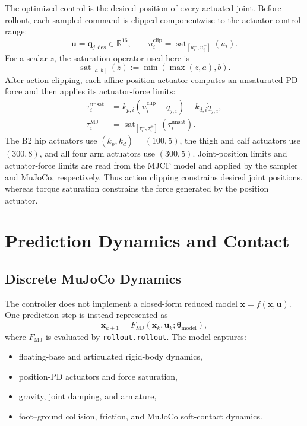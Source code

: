 \documentclass[11pt,a4paper]{article}
\newcommand{\R}{\mathbb{R}}
\newcommand{\code}[1]{\texttt{#1}}
\begin{document}
The optimized control is the desired position of every actuated joint. Before
rollout, each sampled command is clipped componentwise to the actuator control
range:
\begin{equation}
  \boxed{\bm{u}=\bm{q}_{j,\mathrm{des}}\in\R^{16}},
  \qquad
  u_i^{\mathrm{clip}}
  =\operatorname{sat}_{[u_i^-,u_i^+]}(u_i).
\end{equation}
For a scalar $z$, the saturation operator used here is
\begin{equation}
  \operatorname{sat}_{[a,b]}(z)
  := \min\!\left(\max(z,a),b\right).
\end{equation}
After action clipping, each affine position actuator computes an unsaturated
PD force and then applies its actuator-force limits:
\begin{align}
  \tau_i^{\mathrm{unsat}}
  &=k_{p,i}(u_i^{\mathrm{clip}}-q_{j,i})-k_{d,i}\dot q_{j,i},\\
  \tau_i^{\mathrm{MJ}} &=
  \operatorname{sat}_{[\tau_i^-,\tau_i^+]}
  \left(\tau_i^{\mathrm{unsat}}\right).
\end{align}
The B2 hip actuators use $(k_p,k_d)=(100,5)$, the thigh and calf actuators
use $(300,8)$, and all four arm actuators use $(300,5)$. Joint-position
limits and actuator-force limits are read from the MJCF model and applied by
the sampler and MuJoCo, respectively. Thus action clipping constrains desired
joint positions, whereas torque saturation constrains the force generated by
the position actuator.

\section{Prediction Dynamics and Contact}

\subsection{Discrete MuJoCo Dynamics}

The controller does not implement a closed-form reduced model
$\dot{\bm{x}}=f(\bm{x},\bm{u})$. One prediction step is instead represented as
\begin{equation}
  \boxed{
  \bm{x}_{k+1}=F_{\mathrm{MJ}}
  (\bm{x}_k,\bm{u}_k;\bm{\theta}_{\mathrm{model}}),
  }
\end{equation}
where $F_{\mathrm{MJ}}$ is evaluated by \code{rollout.rollout}. The model
captures:
\begin{itemize}
  \item floating-base and articulated rigid-body dynamics,
  \item position-PD actuators and force saturation,
  \item gravity, joint damping, and armature,
  \item foot--ground collision, friction, and MuJoCo soft-contact dynamics.
\end{itemize}
\end{document}

